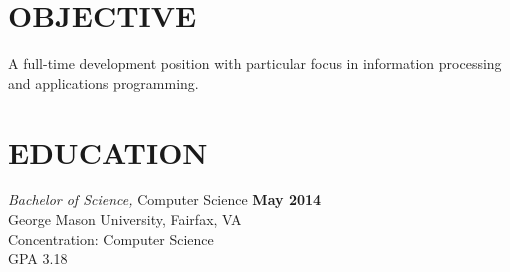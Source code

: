 \documentclass[line, margin]{res}
\begin{document}
\address{4607 N Sheridan Rd Apt 204, Chicago, IL 60640}
\address{Cell: 571.337.9654, Email: cameron.pelkey@gmail.com}


\begin{resume}

\section{OBJECTIVE}  A full-time development position with particular focus in information processing and applications programming.


\section{EDUCATION} {\sl Bachelor of Science,} Computer Science \hfill \textbf{May 2014}\\
		George Mason University, Fairfax, VA\\
		Concentration: Computer Science \\
		GPA 3.18





\end{resume}
\end{document}
